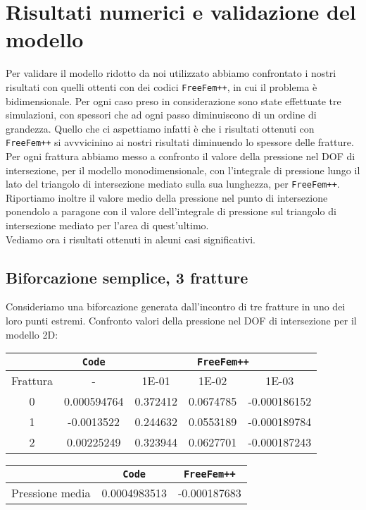 \chapter{Risultati numerici e validazione del modello} 
Per validare il modello ridotto da noi utilizzato abbiamo confrontato i nostri risultati con quelli ottenti con dei codici \texttt{FreeFem++}, in cui il problema è bidimensionale. Per ogni caso preso in considerazione sono state effettuate tre simulazioni, con spessori che ad ogni passo diminuiscono di un ordine di grandezza. Quello che ci aspettiamo infatti è che i risultati ottenuti con \texttt{FreeFem++}  si avvvicinino ai nostri risultati diminuendo lo spessore delle fratture.\\
\noindent Per ogni frattura abbiamo messo a confronto il valore della pressione nel DOF di intersezione, per il modello monodimensionale, con l'integrale di pressione lungo il lato del triangolo di intersezione mediato sulla sua lunghezza, per \texttt{FreeFem++}.
Riportiamo inoltre il valore medio della pressione nel punto di intersezione ponendolo a paragone con il valore dell'integrale di pressione sul triangolo di intersezione mediato per l'area di quest'ultimo.\\
Vediamo ora i risultati ottenuti in alcuni casi significativi.
\section{Biforcazione semplice, 3 fratture}
Consideriamo una biforcazione generata dall'incontro di tre fratture in uno dei loro punti estremi.
Confronto valori della pressione nel DOF di intersezione per il modello 2D:\\
\begin{center}
\begin{tabular}{|c|c|c|c|c|}
\hline
 & \textbf{\texttt{Code}} & \multicolumn{3}{|c|}{\textbf{\texttt{FreeFem++}}} \\
\hline
\multicolumn{1}{|c|}{Frattura} & - &
\multicolumn{1}{|c|}{1E-01} & 1E-02 & 1E-03 \\
\hline
 0 & 0.000594764 & 0.372412 & 0.0674785 & -0.000186152\\
 1 & -0.0013522 & 0.244632 & 0.0553189 & -0.000189784\\
 2 & 0.00225249 & 0.323944 & 0.0627701 & -0.000187243\\
\hline
\end{tabular}
\end{center}

\begin{center}
\begin{tabular}{|c|c|c|}
\hline
 & \textbf{\texttt{Code}} & \multicolumn{1}{|c|}{\textbf{\texttt{FreeFem++}}} \\
\hline
 Pressione media & 0.0004983513 & -0.000187683\\
\hline
\end{tabular}
\end{center}

